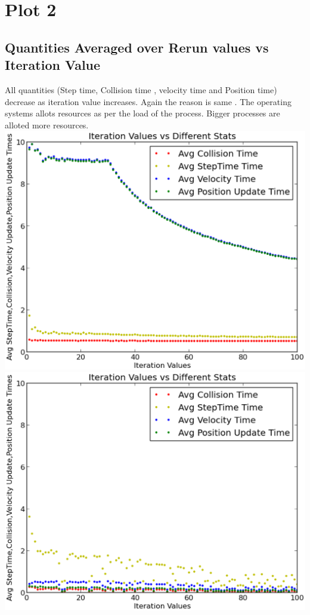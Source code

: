 \documentclass[a4paper,11pt]{report}
\begin{document}
\section{Plot 2}
\subsection{Quantities Averaged over Rerun values vs Iteration Value} 
All quantities (Step time, Collision time , velocity time and Position time) decrease as iteration value increases.
Again the reason is same . The operating systems allots resources as per the load of the process. Bigger processes are alloted more resources.\\
\includegraphics[scale=.3]{doc/g12_plot02.eps}
\includegraphics[scale=.3]{doc/g12_plotload02.eps} \\
\end{document}

